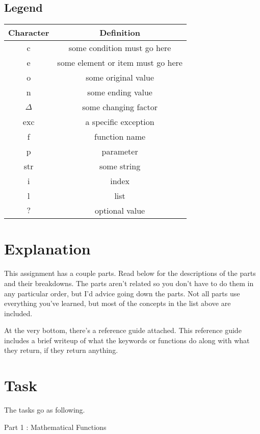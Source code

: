 \documentclass[12pt]{report}
\newcommand\tab[1][1cm]{\hspace*{#1}}
\begin{document}
\subsection*{Legend}

\begin{tabular}{| c | c |}
    \hline
    Character & Definition \\
    \hline
    c & some condition must go here \\
    \hline
    e & some element or item must go here \\
    \hline
    o & some original value \\
    \hline
    n & some ending value \\
    \hline
    ${\Delta}$ & some changing factor \\ 
    \hline
    exc & a specific exception \\
    \hline
    f & function name \\
    \hline
    p & parameter \\
    \hline
    str & some string \\
    \hline
    i & index \\
    \hline
    l & list \\
    \hline
    ${?}$ & optional value \\
    \hline
\end{tabular}


\section*{Explanation}

This assignment has a couple parts. 
Read below for the descriptions of the parts and their breakdowns. 
The parts aren't related so you don't have to do them in any particular order, but I'd advice going down the parts. 
Not all parts use everything you've learned, but most of the concepts in the list above are included.

At the very bottom, there's a reference guide attached. This reference guide includes a brief writeup of what the keywords or functions do along with what they return, if they return anything.

\section*{Task}

The tasks go as following. 

\tab Part 1 : Mathematical Functions
\end{document}
